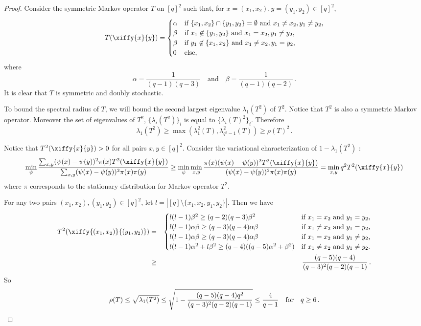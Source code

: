 \begin{proof}
  Consider the symmetric Markov operator $T$ on $[q]^2$ such that, for
  $x=(x_1,x_2), y=(y_1,y_2)\in [q]^2$,
  \[T(\xiffy{x}{y}) =
  \begin{cases}
    \alpha &\mbox{if $\{x_1,x_2\}\cap\{y_1,y_2\}=\emptyset$
      and $x_1\neq x_2, y_1\neq y_2$,}\\
    \beta &\mbox{if $x_1\not\in\{y_1,y_2\}$
      and $x_1= x_2, y_1\neq y_2$,}\\
    \beta &\mbox{if $y_1\not\in\{x_1,x_2\}$
      and $x_1\neq x_2, y_1= y_2$,}\\
    0 & \mbox{else,}
  \end{cases}\] where \[\alpha = \frac{1}{(q-1)(q-3)}\quad \text{and}\quad \beta =
  \frac{1}{(q-1)(q-2)}\,.\] It is clear that $T$ is symmetric and doubly
  stochastic.

  To bound the spectral radius of $T$, we will bound the second
  largest eigenvalue $\lambda_1(T^2)$ of $T^2$. Notice that $T^2$ is
  also a symmetric Markov operator. Moreover the set of eigenvalues of
  $T^2$, $\{\lambda_i(T^2)\}_i$ is equal to $\{{\lambda_i(T)}^2\}_i$.
  Therefore \[\lambda_1(T^2) \ge
  \max(\lambda^2_1(T),\lambda^2_{q^2-1}(T)) \ge \rho(T)^2\,.\]

  Notice that $T^2(\xiffy{x}{y})>0$ for all pairs $x,y\in[q]^2$.
  Consider the variational characterization of $1 - \lambda_1(T^2)$
  \cite{Sinclair92}:
  \[\min_\psi \frac{\sum_{x,y}
    (\psi(x) - \psi(y))^2 \pi(x) T^2(\xiffy{x}{y})}{\sum_{x,y}
    (\psi(x)-\psi(y))^2 \pi(x)\pi(y)} \ge \min_\psi \min_{x,y}
  \frac{\pi(x) (\psi(x) - \psi(y))^2
    T^2(\xiffy{x}{y})}{(\psi(x)-\psi(y))^2 \pi(x)\pi(y)} = \min_{x,y}
  q^2 T^2(\xiffy{x}{y})\] where $\pi$ corresponds to the stationary
  distribution for Markov operator $T^2$.


  For any two pairs $(x_1,x_2),(y_1,y_2)\in[q]^2$, let $l =
  |[q]\setminus \{x_1,x_2,y_1,y_2\}|$. Then we have
  \begin{eqnarray*}
    T^2(\xiffy{(x_1,x_2)}{(y_1,y_2)}) &=& 
    \begin{cases} l (l-1)\beta^2\ge (q-2)(q-3)\beta^2 & 
      \mbox{if $x_1=x_2$ and $y_1=y_2$,}\\
      l (l-1) \alpha \beta\ge (q-3)(q-4)\alpha\beta & 
      \mbox{if $x_1\neq x_2$ and $y_1=y_2$,}\\
      l (l-1) \alpha \beta\ge (q-3)(q-4)\alpha\beta & 
      \mbox{if $x_1=x_2$ and $y_1\neq y_2$,}\\
      l (l-1) \alpha^2 + l \beta^2 \ge (q-4)((q-5)\alpha^2 + \beta^2) &
      \mbox{if $x_1\neq x_2$ and $y_1\neq y_2$.}
  \end{cases}\\
  &\ge& \frac{(q-5) (q-4)}{(q-3)^2 (q-2) (q-1)}\,.
  \end{eqnarray*}
  So \[\rho(T)\le \sqrt{\lambda_1(T^2)} \le \sqrt{1-\frac{(q-5) (q-4)
      q^2}{(q-3)^2 (q-2) (q-1)}} \le 
%
\frac{4}{q-1}\quad \text{for} \quad q\ge 6\,.\qedhere\]
\end{proof}
%
